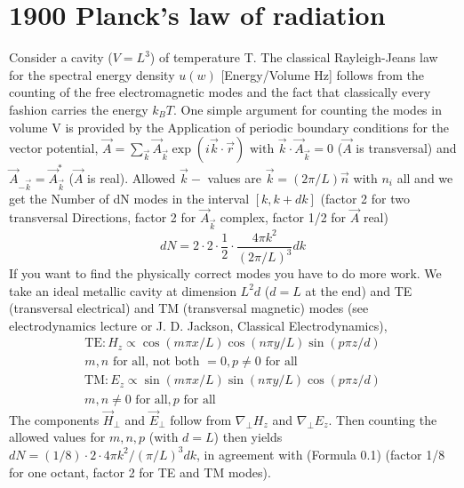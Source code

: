 \section{1900 Planck's law of radiation}
Consider a cavity ($V = L^3$) of temperature T. The classical Rayleigh-Jeans law for the spectral energy density $u(w)$ [Energy/Volume Hz] follows from the counting of the free electromagnetic modes and the fact that classically every fashion carries the energy $k_BT$. One simple argument for counting the modes in volume V is provided by the Application of periodic boundary conditions for the vector potential, $\vec{A}=\sum_{\vec{k}} \vec{A}_{\vec{k}} \exp (i \vec{k} \cdot \vec{r}) \text { with } \vec{k} \cdot \vec{A}_{\vec{k}}=0$ ($\vec{A}$ is transversal) and $\vec{A}_{-\vec{k}}=\vec{A}_{\vec{k}}^{*}$ ($\vec{A}$ is real). Allowed $\vec{k}-$ values are $\vec{k}=(2 \pi / L) \vec{n}$ with $n_i$ all and we get the Number of dN modes in the interval $[k, k+ dk]$ (factor 2 for two transversal Directions, factor 2 for $\vec{A}_{\vec{k}}$ complex, factor 1/2 for $\vec{A}$ real)
\begin{equation} \label{0.1}
d N=2 \cdot 2 \cdot \frac{1}{2} \cdot \frac{4 \pi k^{2}}{(2 \pi / L)^{3}} d k
\end{equation}
If you want to find the physically correct modes you have to do more work. We take an ideal metallic cavity at dimension $L^2d$ ($d = L $ at the end) and TE (transversal electrical) and TM (transversal
magnetic) modes (see electrodynamics lecture or J. D. Jackson,
Classical Electrodynamics),
\begin{equation}
\begin{array}{c}{\mathrm{TE}: H_{z} \propto \cos (m \pi x / L) \cos (n \pi y / L) \sin (p \pi z / d)} \\ {m, n \mbox  { for all, not both }=0, p \neq 0 \mbox{ for all}}\end{array}
\end{equation}
\begin{equation}
\begin{array}{c}{\mathrm{TM}: E_{z} \propto \sin (m \pi x / L) \sin (n \pi y / L) \cos (p \pi z / d)} \\ {m, n \neq 0 \mbox{ for all}, p \mbox  { for all }}\end{array}
\end{equation}
The components $\vec{H}_{\bot}$ and $\vec{E}_{\bot}$ follow from $\nabla_{\bot}H_z$ and $\nabla_{\bot}E_z$. Then counting the allowed values for $m,n,p$ (with $ d = L$) then yields $dN = (1/8)\cdot 2 \cdot 4\pi k^2 / (\pi/L)^3 dk$, in agreement with (Formula 0.1) (factor 1/8 for one octant, factor 2 for TE and TM modes).
